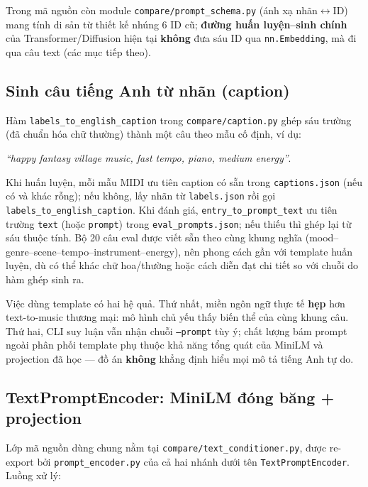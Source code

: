 Trong mã nguồn còn module \texttt{compare/prompt\_schema.py} (ánh xạ nhãn$\leftrightarrow$ID) mang tính di sản từ thiết kế nhúng 6 ID cũ; \textbf{đường huấn luyện--sinh chính} của Transformer/Diffusion hiện tại \textbf{không} đưa sáu ID qua \texttt{nn.Embedding}, mà đi qua câu text (các mục tiếp theo).

\subsection{Sinh câu tiếng Anh từ nhãn (caption)}
\label{sec:ch3-caption}

Hàm \texttt{labels\_to\_english\_caption} trong \texttt{compare/caption.py} ghép sáu trường (đã chuẩn hóa chữ thường) thành một câu theo mẫu cố định, ví dụ:

\begin{center}
\textit{``happy fantasy village music, fast tempo, piano, medium energy''}.
\end{center}

Khi huấn luyện, mỗi mẫu MIDI ưu tiên caption có sẵn trong \texttt{captions.json} (nếu có và khác rỗng); nếu không, lấy nhãn từ \texttt{labels.json} rồi gọi \texttt{labels\_to\_english\_caption}. Khi đánh giá, \texttt{entry\_to\_prompt\_text} ưu tiên trường \texttt{text} (hoặc \texttt{prompt}) trong \texttt{eval\_prompts.json}; nếu thiếu thì ghép lại từ sáu thuộc tính. Bộ 20 câu eval được viết sẵn theo cùng khung nghĩa (mood--genre--scene--tempo--instrument--energy), nên phong cách gần với template huấn luyện, dù có thể khác chữ hoa/thường hoặc cách diễn đạt chi tiết so với chuỗi do hàm ghép sinh ra.

Việc dùng template có hai hệ quả. Thứ nhất, miền ngôn ngữ thực tế \textbf{hẹp} hơn text-to-music thương mại: mô hình chủ yếu thấy biến thể của cùng khung câu. Thứ hai, CLI suy luận vẫn nhận chuỗi \texttt{--prompt} tùy ý; chất lượng bám prompt ngoài phân phối template phụ thuộc khả năng tổng quát của MiniLM và projection đã học --- đồ án \textbf{không} khẳng định hiểu mọi mô tả tiếng Anh tự do.

\subsection{TextPromptEncoder: MiniLM đóng băng + projection}
\label{sec:ch3-text-encoder}

Lớp mã nguồn dùng chung nằm tại \texttt{compare/text\_conditioner.py}, được re-export bởi \texttt{prompt\_encoder.py} của cả hai nhánh dưới tên \texttt{TextPromptEncoder}. Luồng xử lý:

